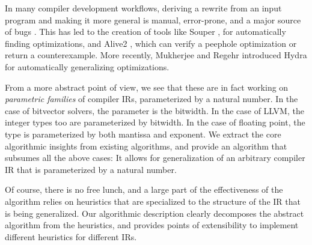 \documentclass[review, anonymous, acmsmall]{acmart}
\begin{document}
In many compiler development workflows, deriving a rewrite from an input program and making it more general is manual,
error-prone, and a major source of bugs \cite{yang_finding_2011}.
This has led to the creation of tools like Souper \cite{sasnauskas_souper_2018},
for automatically finding optimizations,
and Alive2 \cite{lopes_provably_2015, lopes_alive2_2021},
which can verify a peephole optimization or return a counterexample.
More recently, Mukherjee and Regehr \cite{mukherjee_hydra_2024} introduced Hydra for automatically generalizing optimizations.

From a more abstract point of view, we see that these are in fact working on \emph{parametric families} of compiler IRs,
parameterized by a natural number.
In the case of bitvector solvers, the parameter is the bitwidth.
In the case of LLVM, the integer types too are parameterized by bitwidth.
In the case of floating point, the type is parameterized by both mantissa and exponent.
We extract the core algorithmic insights from existing algorithms,
and provide an algorithm that subsumes all the above cases: It allows for generalization of an arbitrary compiler IR
that is parameterized by a natural number.

Of course, there is no free lunch, and a large part of the effectiveness of the algorithm
relies on heuristics that are specialized to the structure of the IR that is being generalized.
Our algorithmic description clearly decomposes the abstract algorithm from the heuristics,
and provides points of extensibility to implement different heuristics for different IRs.


\end{document}
